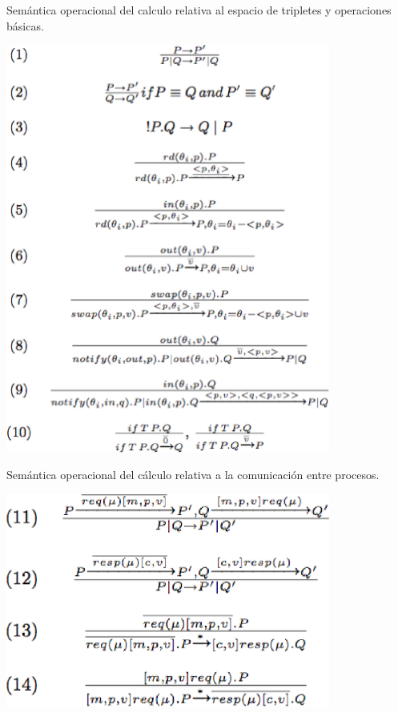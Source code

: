 \begin{table}
\vspace{2.4in}
\caption{Sem\'antica operacional del calculo relativa al espacio de tripletes y operaciones b\'asicas.}
\includegraphics[width=0.8\textwidth]{tabla2}
\label{tabla2}
\end{table}
\clearpage
\newpage

\begin{table}
\vspace{2.4in}
\caption{Sem\'antica operacional del c\'alculo relativa a la comunicaci\'on entre procesos.}
\includegraphics[width=0.8\textwidth]{tabla3}
\label{tabla3}
\end{table}
\clearpage
\newpage

